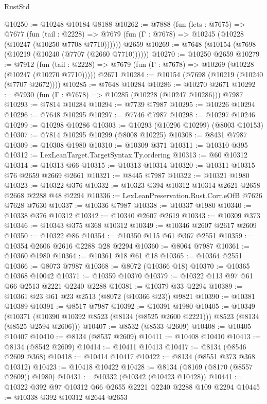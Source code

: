 \begin{lexlean}{RustStd}
\begin{coremodule}
@10250 := @10248 @10184 @8188
@10262 := @7888
    (fun (lets : @7675) =>
    @7677
      (fun (tail : @2228) =>
      @7679 (fun (Γ : @7678) => @10245 (@10228 (@10247 (@10250 @7708 @7710))))))
    @2659
@10269 := @7648 (@10154 (@7698 (@10219 (@10240 (@7707 (@2660 @7710))))))
@10270 := @10250 @2659
@10279 := @7912
    (fun (tail : @2228) => @7679 (fun (Γ : @7678) => @10269 (@10228 (@10247 (@10270 @7710)))))
    @2671
@10284 := @10154 (@7698 (@10219 (@10240 (@7707 @2672))))
@10285 := @7648 @10284
@10286 := @10270 @2671
@10292 := @7930 (fun (Γ : @7678) => @10285 (@10228 (@10247 @10286))) @7987
@10293 := @7814 @10284
@10294 := @7739 @7987
@10295 := @10226 @10294
@10296 := @7648 @10295
@10297 := @7746 @7987
@10298 := @10297 @10246
@10299 := @10298 @10286
@10303 := @10293 (@10296 @10299) (@8003 @10153)
@10307 := @7814 @10295 @10299 (@8008 @10225)
@10308 := @8431 @7987
@10309 := @10308 @1980
@10310 := @10309 @371
@10311 := @10310 @395
@10312 := LexLeanTarget.TargetSyntax.Ty.ordering
@10313 := @60 @10312
@10314 := @10313 @66
@10315 := @10313 @10314
@10320 := @10311 @10315 @76 @2659 @2669 @2661
@10321 := @8445 @7987
@10322 := @10321 @1980
@10323 := @10322 @376
@10332 := @10323 @394 @10312 @10314 @2621 @2658 @2668 @2288 @48 @2294
@10336 := LexLeanPreservation.Rust.Corr.eOfB @7626 @7628 @7630
@10337 := @10336 @7987
@10338 := @10337 @1980
@10340 := @10338 @376 @10312
@10342 := @10340 @2607 @2619
@10343 := @10309 @373
@10346 := @10343 @375 @368 @10312
@10349 := @10346 @2607 @2617 @2609
@10350 := @10322 @86
@10354 := @10350 @115 @61 @367 @2551
@10359 := @10354 @2606 @2616 @2288 @28 @2294
@10360 := @8064 @7987
@10361 := @10360 @1980
@10364 := @10361 @18 @61 @18
@10365 := @10364 @2551
@10366 := @8073 @7987
@10368 := @8072 (@10366 @18)
@10370 := @10365 @10368 @10042
@10371 := @10359 @10370
@10379 := @10322 @113 @97 @61 @66 @2513 @2221 @2240 @2288
@10381 := @10379 @33 @2294
@10389 := @10361 @23 @61 @23 @2513 (@8072 (@10366 @23)) @9821
@10390 := @10381 @10389
@10391 := @8517 @7987
@10392 := @10391 @1980
@10405 := @10349
    (@10371 (@10390 @10392 @8523 (@8134 (@8525 @2600 @2221))) @8523 (@8134 (@8525 @2594 @2606)))
@10407 := @8532 (@8533 @2609)
@10408 := @10405 @10407
@10410 := @8134 (@8537 @2609)
@10411 := @10408 @10410
@10413 := @8134 (@8542 @2609)
@10414 := @10411 @10413
@10417 := @8134 (@8546 @2609 @368)
@10418 := @10414 @10417
@10422 := @8134 (@8551 @373 @368 @10312)
@10423 := @10418 @10422
@10428 := @8134 (@8169 (@8170 (@8557 @2609)) @1980)
@10431 := @10332 (@10342 (@10423 @10428))
@10441 := @10322 @392 @97 @10312 @66 @2655 @2221 @2240 @2288 @109 @2294
@10445 := @10338 @392 @10312 @2644 @2653

\end{coremodule}
\end{lexlean}
